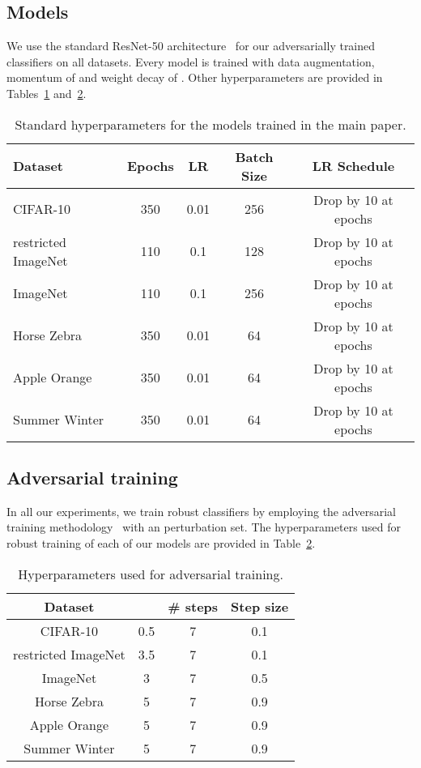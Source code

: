 \documentclass{article}
\newcommand{\HtoZ}{Horse  Zebra}
\newcommand{\StoW}{Summer  Winter}
\newcommand{\AtoO}{Apple  Orange}
\begin{document}
{\subsection{Models}
\label{sec:models}
We use the standard ResNet-50 architecture~\cite{he2016deep} for our 
adversarially trained classifiers on all datasets. Every model is trained with 
data augmentation, momentum of  and weight decay of .
Other hyperparameters are provided in Tables~\ref{tab:nat_hyper} 
and~\ref{tab:adv_hyper}. 

\begin{table}[!h]
	\caption{Standard hyperparameters for the models trained in the main paper.}
	\begin{center}
		\begin{tabular}{l|cccc}
			\toprule
			{\bf Dataset} & Epochs & LR & Batch Size & LR Schedule \\
			\midrule
			CIFAR-10 & 350 & 0.01 & 256 & Drop by 10 at epochs   \\
			restricted ImageNet & 110 & 0.1 & 128 & Drop by 10 at epochs   \\
			ImageNet & 110 &  0.1 & 256 &  Drop by 10 at epochs    \\
			\HtoZ & 350 & 0.01 & 64 & Drop by 10 at epochs   \\
			\AtoO & 350 & 0.01 & 64 & Drop by 10 at epochs   \\
			\StoW & 350 & 0.01 & 64 & Drop by 10 at epochs   \\
			\bottomrule
		\end{tabular}
	\end{center}
	\label{tab:nat_hyper}
\end{table}



\subsection{Adversarial training}
In all our experiments, we train robust classifiers by employing the adversarial 
training methodology~\cite{madry2018towards} with an  perturbation 
set. The hyperparameters used for robust training of each of our models
are provided in Table~\ref{tab:adv_hyper}.

\begin{table}[!h]
	\caption{Hyperparameters used for adversarial training.}
\begin{center}
\setlength{\tabcolsep}{.8cm}
\begin{tabular}{cccc}
\toprule 
Dataset &  & \# steps & Step size \\
\midrule
CIFAR-10 & 0.5 & 7 & 0.1 \\
restricted ImageNet & 3.5 & 7 & 0.1 \\
ImageNet & 3 & 7 & 0.5 \\
{\HtoZ} & 5 & 7 & 0.9 \\
{\AtoO} & 5 & 7 & 0.9 \\
{\StoW} & 5 & 7 & 0.9 \\
\bottomrule 
\end{tabular}
\end{center}
	\label{tab:adv_hyper}
\end{table}


}
\end{document}
